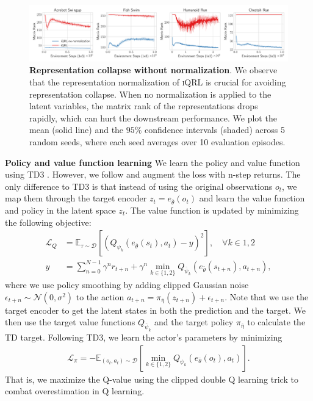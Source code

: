 \documentclass{article}
\theoremstyle{plain}
\theoremstyle{definition}
\theoremstyle{remark}
\newcommand{\our}{\textsc{iQRL}\xspace}
\newcommand{\E}{\mathbb{E}}
\begin{document}
\begin{figure}[ht]
	\vskip 0.2in
	\begin{center}
		\centerline{\includegraphics[width=1.0\textwidth]{./figs/rank-comparison-z1.pdf}}
		\caption{\textbf{Representation collapse without normalization}. We observe that the representation normalization of \our is crucial for avoiding representation collapse. When no normalization is applied to the latent variables, the matrix rank of the representations drops rapidly, which can hurt the downstream performance. We plot the mean (solid line) and the $95\%$ confidence intervals (shaded) across 5 random seeds, where each seed averages over 10 evaluation episodes.}
		\label{fig:rank-comparison-z1}
	\end{center}
	\vskip -0.2in
\end{figure}



\textbf{Policy and value function learning}
We learn the policy and value function using TD3 \citep{fujimotoAddressingFunctionApproximation2018}.
However, we follow \citet{yaratsMasteringVisualContinuous2021,zhaoSimplifiedTemporalConsistency2023}
and augment the loss with n-step returns.
The only difference to TD3 is that instead of using the original observations $o_{t}$, we map them through the
target encoder $z_{t} = e_{\bar{\theta}}(o_{t})$ and learn the value function and policy in the latent space $z_{t}$.
The value function is updated by minimizing the following objective:
\begin{align} \label{eq:value-loss}
  \mathcal{L}_{Q} &= \E_{\tau \sim \mathcal{D}} \left[ (Q_{\psi_{k}}(e_{\bar{\theta}}(s_{t}), a_{t}) - y)^{2}  \right], \quad  \forall k \in 1, 2 \\
  y &= \sum_{n=0}^{N-1} \gamma^{n} r_{t+n} + \gamma^{n} \min_{k \in \{1,2\}} Q_{\bar{\psi}_{k}}(e_{\bar{\theta}}(s_{t+n}), a_{t+n}), \nonumber
\end{align}
where we use policy smoothing by adding clipped Gaussian noise $\epsilon_{t+n} \sim \mathcal{N} (0,\sigma^{2})$ to the
action $a_{t+n} = \pi_{\bar{\eta}}(z_{t+n}) + \epsilon_{t+n}$.
Note that we use the target encoder to get the latent states in both the prediction and the target.
We then use the target value functions $Q_{\bar{\psi}_{k}}$ and the target policy $\pi_{\bar{\eta}}$ to calculate the TD target.
Following TD3, we learn the actor's parameters by minimizing
%
\begin{align} \label{eq:policy-loss}
 \mathcal{L}_{\pi} = - \E_{(o_{t}, a_{t}) \sim \mathcal{D}} \left[ \min_{k\in\{1,2\}} Q_{\psi_{k}}(e_{\bar{\theta}}(o_{t}), a_{t}) \right].
\end{align}
%
That is, we maximize the Q-value using the clipped double Q learning trick to combat overestimation in Q learning.
\end{document}
